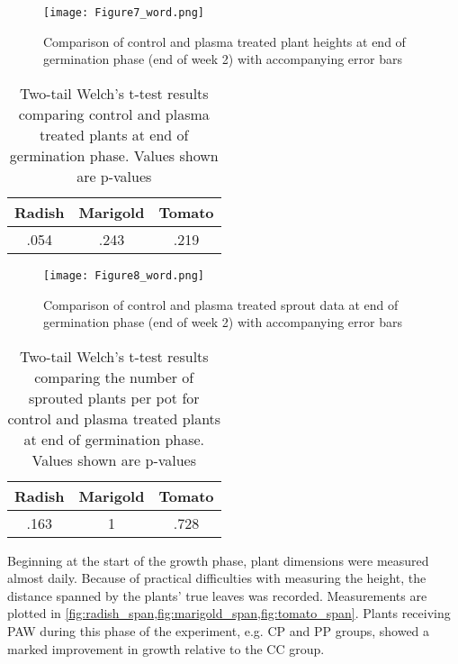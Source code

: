 \begin{figure}[htbp]
  \centering
  \texttt{[image: Figure7\_word.png]}
  \caption{Comparison of control and plasma treated plant heights at end of germination phase (end of week 2) with accompanying error bars}
  \label{fig:germ_heights}
\end{figure}

\begin{table}[htpb]
  \begin{center}
    \begin{tabular}{c |c |c }
      Radish & Marigold & Tomato \\
      \hline
      .054 & .243 & .219
    \end{tabular}
  \end{center}
  \caption{Two-tail Welch's t-test results comparing control and plasma treated plants at end of germination phase.  Values shown are p-values}
  \label{tab:germ_heights_t}
\end{table}

\begin{figure}[htbp]
  \centering
  \texttt{[image: Figure8\_word.png]}
  \caption{Comparison of control and plasma treated sprout data at end of germination phase (end of week 2) with accompanying error bars}
  \label{fig:germ_sprouts}
\end{figure}

\begin{table}[htpb]
  \begin{center}
    \begin{tabular}{c |c |c }
      Radish & Marigold & Tomato \\
      \hline
      .163 & 1 & .728
    \end{tabular}
  \end{center}
  \caption{Two-tail Welch's t-test results comparing the number of sprouted plants per pot for control and plasma treated plants at end of germination phase.  Values shown are p-values}
  \label{tab:germ_sprouts_t}
\end{table}

Beginning at the start of the growth phase, plant dimensions were measured almost daily. Because of practical difficulties with measuring the height, the distance spanned by the plants' true leaves was recorded.  Measurements are plotted in \cref{fig:radish_span,fig:marigold_span,fig:tomato_span}. Plants receiving PAW during this phase of the experiment, e.g. CP and PP groups, showed a marked improvement in growth relative to the CC group.


